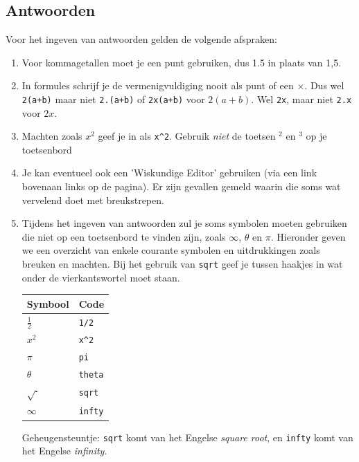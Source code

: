 \documentclass{ximera}
\begin{document}
\begin{onlineOnly}
 \subsection*{Antwoorden}
\begin{remark}
Voor het ingeven van antwoorden gelden de volgende afspraken:
    \begin{enumerate}
        \item Voor kommagetallen moet je een punt gebruiken, dus 1.5 in plaats van 1,5.
        \item In formules schrijf je de vermenigvuldiging nooit als punt of een $\times$. Dus wel \verb|2(a+b)| maar niet \verb|2.(a+b)| of \verb|2x(a+b)| voor $2(a+b)$. Wel \verb|2x|, maar niet \verb|2.x| voor $2x$.
        \item Machten zoals $x^2$ geef je in als  \verb|x^2|. Gebruik \textit{niet} de toetsen ${}^2$ en ${}^3$ op je toetsenbord
        \item Je kan eventueel ook een 'Wiskundige Editor' gebruiken (via een link bovenaan links op de pagina). Er zijn gevallen gemeld waarin die soms wat vervelend doet met breukstrepen.
         
    \item Tijdens het ingeven van antwoorden zul je soms symbolen moeten gebruiken die niet op een toetsenbord te vinden zijn, zoals $\infty$, $\theta$ en $\pi$. Hieronder geven we een overzicht van enkele courante symbolen en uitdrukkingen zoals breuken en machten. Bij het gebruik van \verb|sqrt| geef je tussen haakjes in wat onder de vierkantswortel moet staan.
 
\begin{center}
\def\arraystretch{1.5}
\begin{tabular}{l|l}
Symbool & Code \\
\hline
$\frac{1}{2}$ & \verb|1/2| \\
$x^2$ & \verb|x^2| \\
$\pi$ & \verb|pi| \\
$\theta$ & \verb|theta| \\
$\sqrt{\cdot}$ & \verb|sqrt| \\%
$\infty$ & \verb|infty| \\%
\end{tabular}
\end{center}
 
Geheugensteuntje: \verb|sqrt| komt van het Engelse \textit{square root}, en \verb|infty| komt van het Engelse \textit{infinity}.
    \end{enumerate}
 

\end{remark}
\end{onlineOnly}
\end{document}
